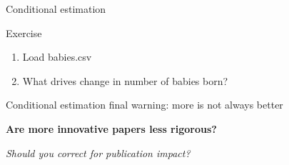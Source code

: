 \documentclass[10pt]{beamer}\usepackage[]{graphicx}\usepackage[]{color}
\begin{document}
\begin{frame}{Conditional estimation}

  
  \begin{exampleblock}{Exercise}
    \begin{enumerate}
      \item Load babies.csv
      \item What drives change in number of babies born?
    \end{enumerate}
  \end{exampleblock}
  
  
\end{frame}

\begin{frame}[fragile]{Conditional estimation final warning: more is not always better}

  
  \textbf{Are more innovative papers less rigorous?}
  \begin{center}
  \end{center}
  
  \textit{Should you correct for publication impact?}
  
\end{frame}
\end{document}
